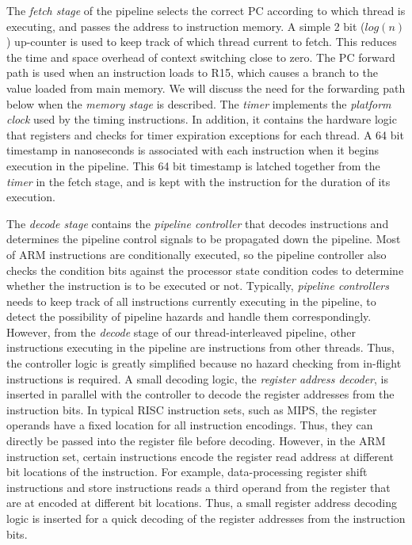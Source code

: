 The \emph{fetch stage} of the pipeline selects the correct PC according to which thread is executing, and passes the address to instruction memory. 
A simple 2 bit ($log(n)$) up-counter is used to keep track of which thread current to fetch.
This reduces the time and space overhead of context switching close to zero. 
The PC forward path is used when an instruction loads to R15, which causes a branch to the value loaded from main memory.  
We will discuss the need for the forwarding path below when the \emph{memory stage} is described.
The \emph{timer} implements the \emph{platform clock} used by the timing instructions.
In addition, it contains the hardware logic that registers and checks for timer expiration exceptions for each thread.
A 64 bit timestamp in nanoseconds is associated with each instruction when it begins execution in the pipeline.
This 64 bit timestamp is latched together from the \emph{timer} in the fetch stage, and is kept with the instruction for the duration of its execution. 

The \emph{decode stage} contains the \emph{pipeline controller} that decodes instructions and determines the pipeline control signals to be propagated down the pipeline.
Most of ARM instructions are conditionally executed, so the pipeline controller also checks the condition bits against the processor state condition codes to determine whether the instruction is to be executed or not.  
Typically, \emph{pipeline controllers} needs to keep track of all instructions currently executing in the pipeline, to detect the possibility of pipeline hazards and handle them correspondingly.
However, from the \emph{decode} stage of our thread-interleaved pipeline, other instructions executing in the pipeline are instructions from other threads.
Thus, the controller logic is greatly simplified because no hazard checking from in-flight instructions is required.  
A small decoding logic, the \emph{register address decoder}, is inserted in parallel with the controller to decode the register addresses from the instruction bits.  
In typical RISC instruction sets, such as MIPS, the register operands have a fixed location for all instruction encodings.
Thus, they can directly be passed into the register file before decoding.   
However, in the ARM instruction set, certain instructions encode the register read address at different bit locations of the instruction.
For example, data-processing register shift instructions and store instructions reads a third operand from the register that are at encoded at different bit locations.
Thus, a small register address decoding logic is inserted for a quick decoding of the register addresses from the instruction bits.

